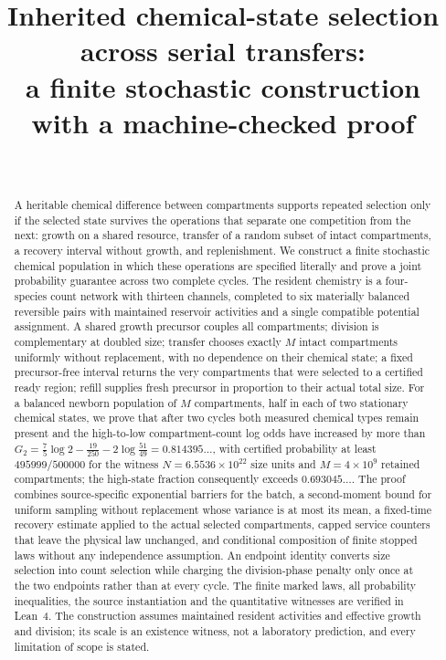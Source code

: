 \documentclass[11pt,a4paper]{article}
\title{Inherited chemical-state selection across serial transfers:\\[4pt]
\large a finite stochastic construction with a machine-checked proof}
\author{\PaperAuthor\\ \small \PaperAffiliation}
\date{\PaperDate}
\theoremstyle{plain}
\theoremstyle{definition}
\theoremstyle{remark}
\begin{document}
\maketitle

\begin{abstract}
A heritable chemical difference between compartments supports repeated selection only if the selected state survives the operations that separate one competition from the next: growth on a shared resource, transfer of a random subset of intact compartments, a recovery interval without growth, and replenishment. We construct a finite stochastic chemical population in which these operations are specified literally and prove a joint probability guarantee across two complete cycles. The resident chemistry is a four-species count network with thirteen channels, completed to six materially balanced reversible pairs with maintained reservoir activities and a single compatible potential assignment. A shared growth precursor couples all compartments; division is complementary at doubled size; transfer chooses exactly $M$ intact compartments uniformly without replacement, with no dependence on their chemical state; a fixed precursor-free interval returns the very compartments that were selected to a certified ready region; refill supplies fresh precursor in proportion to their actual total size. For a balanced newborn population of $M$ compartments, half in each of two stationary chemical states, we prove that after two cycles both measured chemical types remain present and the high-to-low compartment-count log odds have increased by more than $G_2=\frac75\log2-\frac{19}{250}-2\log\frac{51}{49}=0.814395\ldots$, with certified probability at least $495999/500000$ for the witness $N=6.5536\times10^{22}$ size units and $M=4\times10^{9}$ retained compartments; the high-state fraction consequently exceeds $0.693045\ldots$. The proof combines source-specific exponential barriers for the batch, a second-moment bound for uniform sampling without replacement whose variance is at most its mean, a fixed-time recovery estimate applied to the actual selected compartments, capped service counters that leave the physical law unchanged, and conditional composition of finite stopped laws without any independence assumption. An endpoint identity converts size selection into count selection while charging the division-phase penalty only once at the two endpoints rather than at every cycle. The finite marked laws, all probability inequalities, the source instantiation and the quantitative witnesses are verified in Lean~4. The construction assumes maintained resident activities and effective growth and division; its scale is an existence witness, not a laboratory prediction, and every limitation of scope is stated.
\end{abstract}
\end{document}
